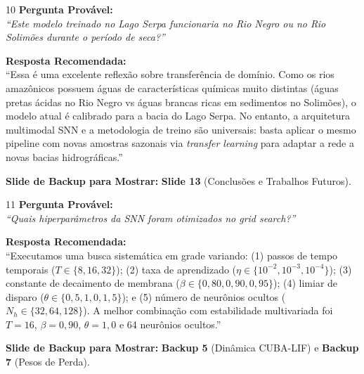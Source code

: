 \documentclass[11pt,a4paper]{article}
\begin{document}
\begin{qnabox}{10}
\textbf{Pergunta Provável:}\\
\textit{``Este modelo treinado no Lago Serpa funcionaria no Rio Negro ou no Rio Solimões durante o período de seca?''}

\vspace{0.2cm}
\textbf{Resposta Recomendada:}\\
``Essa é uma excelente reflexão sobre transferência de domínio. Como os rios amazônicos possuem águas de características químicas muito distintas (águas pretas ácidas no Rio Negro vs águas brancas ricas em sedimentos no Solimões), o modelo atual é calibrado para a bacia do Lago Serpa. No entanto, a arquitetura multimodal SNN e a metodologia de treino são universais: basta aplicar o mesmo pipeline com novas amostras sazonais via \textit{transfer learning} para adaptar a rede a novas bacias hidrográficas.''

\vspace{0.2cm}
\textbf{Slide de Backup para Mostrar:} \textbf{Slide 13} (Conclusões e Trabalhos Futuros).
\end{qnabox}

\begin{qnabox}{11}
\textbf{Pergunta Provável:}\\
\textit{``Quais hiperparâmetros da SNN foram otimizados no grid search?''}

\vspace{0.2cm}
\textbf{Resposta Recomendada:}\\
``Executamos uma busca sistemática em grade variando: (1) passos de tempo temporais ($T \in \{8, 16, 32\}$); (2) taxa de aprendizado ($\eta \in \{10^{-2}, 10^{-3}, 10^{-4}\}$); (3) constante de decaimento de membrana ($\beta \in \{0{,}80, 0{,}90, 0{,}95\}$); (4) limiar de disparo ($\theta \in \{0{,}5, 1{,}0, 1{,}5\}$); e (5) número de neurônios ocultos ($N_h \in \{32, 64, 128\}$). A melhor combinação com estabilidade multivariada foi $T=16$, $\beta=0{,}90$, $\theta=1{,}0$ e 64 neurônios ocultos.''

\vspace{0.2cm}
\textbf{Slide de Backup para Mostrar:} \textbf{Backup 5} (Dinâmica CUBA-LIF) e \textbf{Backup 7} (Pesos de Perda).
\end{qnabox}
\end{document}
